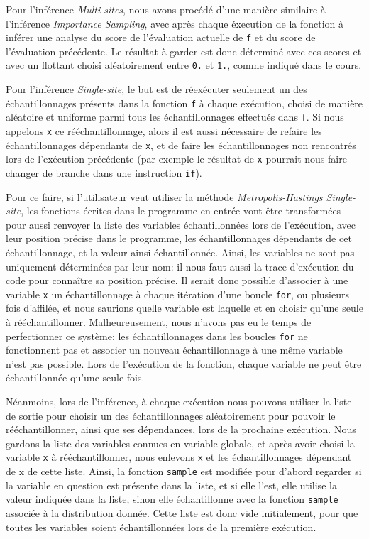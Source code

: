 \documentclass[svgnames]{article}
\begin{document}
Pour l'inférence \emph{Multi-sites}, nous avons procédé d'une manière similaire à l'inférence \emph{Importance Sampling}, avec après chaque éxecution de la fonction à inférer une analyse du score de l'évaluation actuelle de \verb|f| et du score de l'évaluation précédente. Le résultat à garder est donc déterminé avec ces scores et avec un flottant choisi aléatoirement entre \verb|0.| et \verb|1.|, comme indiqué dans le cours.

Pour l'inférence \emph{Single-site}, le but est de réexécuter seulement un des échantillonnages présents dans la fonction \verb|f| à chaque exécution, choisi de manière aléatoire et uniforme parmi tous les échantillonnages effectués dans \verb|f|. Si nous appelons \verb|x| ce rééchantillonnage, alors il est aussi nécessaire de refaire les échantillonnages dépendants de \texttt x, et de faire les échantillonnages non rencontrés lors de l'exécution précédente (par exemple le résultat de \texttt x pourrait nous faire changer de branche dans une instruction \verb|if|).

Pour ce faire, si l'utilisateur veut utiliser la méthode \emph{Metropolis-Hastings Single-site}, les fonctions écrites dans le programme en entrée vont être transformées pour aussi renvoyer la liste des variables échantillonnées lors de l'exécution, avec leur position précise dans le programme, les échantillonnages dépendants de cet échantillonnage, et la valeur ainsi échantillonnée. Ainsi, les variables ne sont pas uniquement déterminées par leur nom: il nous faut aussi la trace d'exécution du code pour connaître sa position précise. Il serait donc possible d'associer à une variable \verb|x| un échantillonnage à chaque itération d'une boucle \verb|for|, ou plusieurs fois d'affilée, et nous saurions quelle variable est laquelle et en choisir qu'une seule à rééchantillonner. Malheureusement, nous n'avons pas eu le temps de perfectionner ce système: les échantillonnages dans les boucles \verb|for| ne fonctionnent pas et associer un nouveau échantillonnage à une même variable n'est pas possible. Lors de l'exécution de la fonction, chaque variable ne peut être échantillonnée qu'une seule fois.

Néanmoins, lors de l'inférence, à chaque exécution nous pouvons utiliser la liste de sortie pour choisir un des échantillonnages aléatoirement pour pouvoir le rééchantillonner, ainsi que ses dépendances, lors de la prochaine exécution. Nous gardons la liste des variables connues en variable globale, et après avoir choisi la variable \verb|x| à rééchantillonner, nous enlevons \verb|x| et les échantillonnages dépendant de x de cette liste. Ainsi, la fonction \verb|sample| est modifiée pour d'abord regarder si la variable en question est présente dans la liste, et si elle l'est, elle utilise la valeur indiquée dans la liste, sinon elle échantillonne avec la fonction \verb|sample| associée à la distribution donnée. Cette liste est donc vide initialement, pour que toutes les variables soient échantillonnées lors de la première exécution.
  
\end{document}
